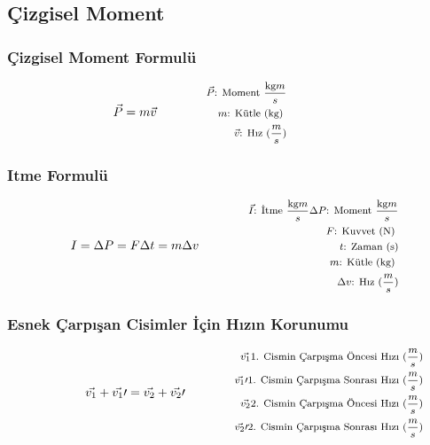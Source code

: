 \subsection{Çizgisel Moment}

\subsubsection*{Çizgisel Moment Formulü}
\begin{equation}
    \vec{P} = m\vec{v} \qquad \qquad \parbox{4cm}{\footnotesize$\begin{aligned}
        \vec{P}\text{: Moment } \frac{\text{kg} m }{s} \\
        m\text{: Kütle (kg) } \\
        \vec{v}\text{: Hız } (\frac{m}{s})
\end{aligned}$}
\end{equation}

\subsubsection*{Itme Formulü}
\begin{equation}
    I = \Delta P = F\Delta t = m \Delta v \qquad \qquad \parbox{4cm}{\footnotesize$\begin{aligned}
        \vec{I}\text{: İtme } \frac{\text{kg} m }{s}
        \Delta P \text{: Moment } \frac{\text{kg} m }{s} \\
        F\text{: Kuvvet (N) } \\
        t\text{: Zaman (s)} \\
        m\text{: Kütle (kg) } \\
        \Delta v \text{: Hız } (\frac{m}{s})
\end{aligned}$}
\end{equation}

\subsubsection*{Esnek Çarpışan Cisimler İçin Hızın Korunumu}
\begin{equation}
    \vec{v_1}  + \vec{v_1} \prime = \vec{v_2} + \vec{v_2} \prime \qquad \qquad \parbox{4cm}{\footnotesize$\begin{aligned}
        \vec{v_1}\text{1. Cismin Çarpışma Öncesi Hızı } (\frac{m}{s}) \\
        \vec{v_1}\prime\text{1. Cismin Çarpışma Sonrası Hızı } (\frac{m}{s}) \\
        \vec{v_2}\text{2. Cismin Çarpışma Öncesi Hızı } (\frac{m}{s}) \\
        \vec{v_2}\prime\text{2. Cismin Çarpışma Sonrası Hızı } (\frac{m}{s})
\end{aligned}$}
\end{equation}